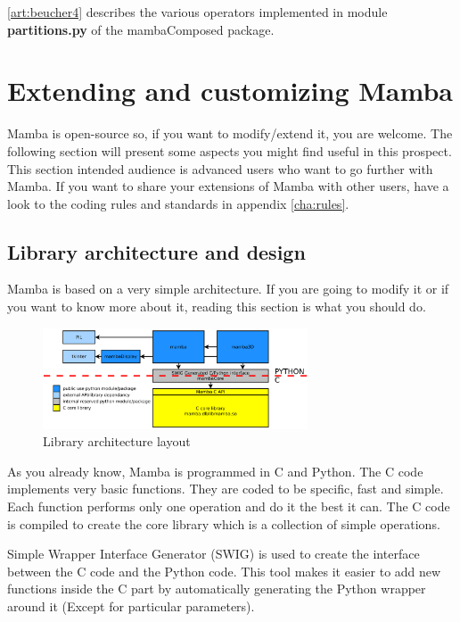 \documentclass[a4paper,10pt,oneside]{article}
\begin{document}
\ref{art:beucher4} describes the various operators implemented in
module \textbf{partitions.py} of the mambaComposed package.

\pagebreak

\section{Extending and customizing Mamba}

Mamba is open-source so, if you want to modify/extend it, you are welcome. The
following section will present some aspects you might find useful in this
prospect. This section intended audience is advanced users who want to go 
further with Mamba. If you want to share your extensions of Mamba with other users,
have a look to the coding rules and standards in appendix \ref{cha:rules}. 

\subsection{Library architecture and design}
\label{cha:lib_arch}

Mamba is based on a very simple architecture. If you are going to modify it or
if you want to know more about it, reading this section is what you should do.

\begin{figure}
\centering
\includegraphics[width=0.7\textwidth]{figures/archi.pdf}
\caption{Library architecture layout}
\label{fig:archi_lay}
\end{figure}

As you already know, Mamba is programmed in C and Python. The C code implements
very basic functions. They are coded to be specific, fast and simple. Each 
function performs only one operation and do it the best it can. The C code is 
compiled to create the core library which is a collection of simple operations.

Simple Wrapper Interface Generator (SWIG) is used to create the interface 
between the C code and the Python code. This tool makes it easier to add new
functions inside the C part by automatically generating the Python wrapper
around it (Except for particular parameters).
\end{document}
